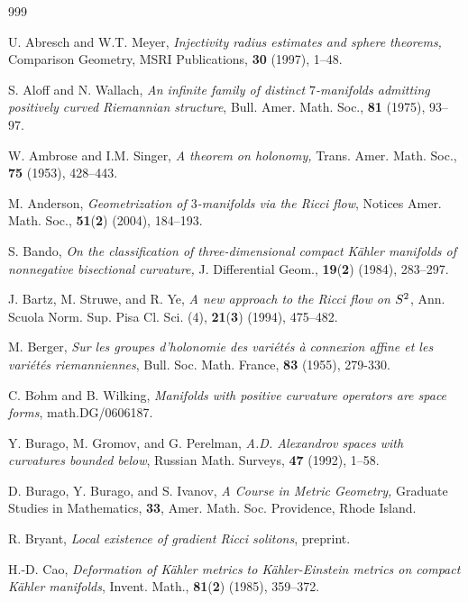 \providecommand{\bysame}{\leavevmode\hbox to 3em{\hrulefill}\thinspace}
\begin{thebibliography}{999}

U. Abresch and W.T. Meyer,
{\it Injectivity radius estimates and sphere theorems,} Comparison
Geometry, MSRI Publications, \textbf{30} (1997), 1--48.

S. Aloff and N. Wallach,
{\it An infinite family of distinct $7$-manifolds admitting
positively curved Riemannian structure}, Bull. Amer. Math. Soc.,
\textbf{81} (1975), 93--97.

W. Ambrose and I.M. Singer,
{\it A theorem on holonomy,} Trans. Amer. Math. Soc., \textbf{75}
(1953), 428--443.

M. Anderson,
{\it Geometrization of $3$-manifolds via the Ricci flow}, Notices
Amer. Math. Soc., {\bf 51}({\bf 2}) (2004), 184--193.

S. Bando,
{\it On the classification of three-dimensional compact K\"ahler
manifolds of nonnegative bisectional curvature,} J. Differential
Geom., \textbf{19}({\bf 2}) (1984), 283--297.

J. Bartz, M. Struwe, and R. Ye,
{\it A new approach to the Ricci flow on $S\sp 2$}, Ann. Scuola
Norm. Sup. Pisa Cl. Sci. (4), \textbf{21}({\bf 3}) (1994),
475--482.

M. Berger,
{\it Sur les groupes d'holonomie des vari\'{e}t\'{e}s \`{a}
connexion affine et les vari\'{e}t\'{e}s riemanniennes}, Bull.
Soc. Math. France, \textbf{83} (1955), 279-330.

   C. B$\ddot{o}$hm and B. Wilking,  {\it Manifolds with positive curvature
operators are space forms}, math.DG/0606187.

Y. Burago, M. Gromov, and G. Perelman,
{\it A.D. Alexandrov spaces with curvatures bounded below},
Russian Math. Surveys, {\bf 47} (1992), 1--58.

D. Burago, Y. Burago, and S. Ivanov,
{\it A Course in Metric Geometry,} Graduate Studies in
Mathematics, \textbf{33}, Amer. Math. Soc. Providence, Rhode
Island.

R. Bryant,
{\it Local existence of gradient Ricci solitons}, preprint.

H.-D. Cao,
{\it Deformation of K\"{a}hler metrics to K\"{a}hler-Einstein
metrics on compact K\"{a}hler manifolds}, Invent. Math.,
\textbf{81}({\bf 2}) (1985), 359--372.


\end{thebibliography}
